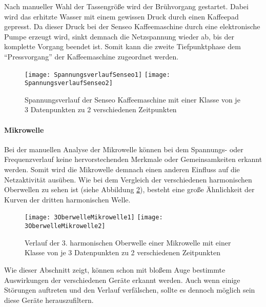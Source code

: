     Nach manueller Wahl der Tassengröße wird der Brühvorgang gestartet. 
    Dabei wird das erhitzte Wasser mit einem gewissen Druck durch einen Kaffeepad gepresst. 
    Da dieser Druck bei der Senseo Kaffeemaschine durch eine elektronische Pumpe erzeugt wird, sinkt demnach die Netzspannung wieder ab, bis der komplette Vorgang beendet ist.
    Somit kann die zweite Tiefpunktphase dem "`Pressvorgang"' der Kaffeemaschine zugeordnet werden.\\
    \newline
    
    \begin{figure}[H]
        \centering
        \texttt{[image: SpannungsverlaufSenseo1]}
        \texttt{[image: SpannungsverlaufSenseo2]}
        \caption{Spannungsverlauf der Senseo Kaffeemaschine mit einer Klasse von je 3 Datenpunkten zu 2 verschiedenen Zeitpunkten}
        \label{fig:SpannungsverlaufSenseo}
    \end{figure}

    \paragraph{Mikrowelle}

    Bei der manuellen Analyse der Mikrowelle können bei dem Spannungs- oder Frequenzverlauf keine hervorstechenden Merkmale oder Gemeinsamkeiten erkannt werden.
    Somit wird die Mikrowelle demnach einen anderen Einfluss auf die Netzaktivität ausüben.
    Wie bei dem Vergleich der verschiedenen harmonischen Oberwellen zu sehen ist (siehe Abbildung \ref{fig:3OberwelleMikrowelle}), besteht eine große Ähnlichkeit der Kurven der dritten harmonischen Welle.\\

    \begin{figure}[H]
        \centering
        \texttt{[image: 3OberwelleMikrowelle1]}
        \texttt{[image: 3OberwelleMikrowelle2]}
        \caption{Verlauf der 3. harmonischen Oberwelle einer Mikrowelle mit einer Klasse von je 3 Datenpunkten zu 2 verschiedenen Zeitpunkten}
        \label{fig:3OberwelleMikrowelle}
    \end{figure}

    \noindent
    Wie dieser Abschnitt zeigt, können schon mit bloßem Auge bestimmte Auswirkungen der verschiedenen Geräte erkannt werden.
    Auch wenn einige Störungen auftreten und den Verlauf verfälschen, sollte es dennoch möglich sein diese Geräte herauszufiltern.
    \newline
    
